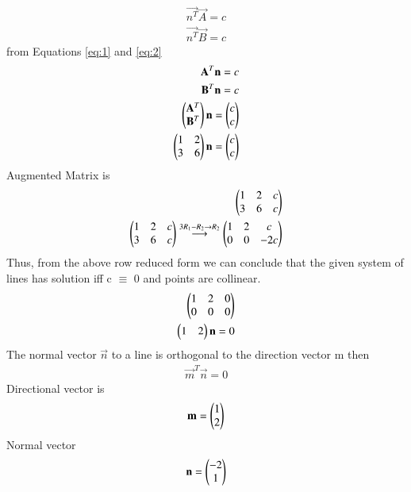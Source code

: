 \documentclass[journal,12pt,twocolumn]{IEEEtran}
\begin{document}
\begin {align}
\vec{n^T} \vec {A}=c \label{eq:1} \\
\vec{n^T} \vec {B}=c  \label{eq:2} 
\end{align}
from Equations \eqref{eq:1} and \eqref{eq:2} \\
\begin{align}
    \mathbf{A}^T \mathbf {n}=c \\
    \mathbf{B}^T \mathbf {n}=c  \\
    \begin{pmatrix}\mathbf{A}^T \\ \mathbf{B}^T\end{pmatrix} \mathbf{n}=\begin{pmatrix}c \\ c\end{pmatrix} \\
    \begin{pmatrix}1 &2 \\ 3&6\end{pmatrix} \mathbf{n}=\begin{pmatrix}c\\c\end{pmatrix}
\end{align}
Augmented Matrix is 
\begin{align}
    \begin{pmatrix}1&2&c\\3&6&c\end{pmatrix} \\
    \begin{pmatrix} 1 &  2 & c \\ 3&  6& c \end{pmatrix} \overset{3R_1-R_2\rightarrow R_2}{\longrightarrow} \begin{pmatrix} 1 &  2& c\\0 &  0 & -2c\end{pmatrix}
\end{align}
Thus, from the above row reduced form we can conclude that the given system of lines has solution iff c $\equiv$ 0 and points are collinear.
\begin{align}
    \begin{pmatrix} 1 &  2& 0\\0 &  0 & 0\end{pmatrix} \\
    \begin{pmatrix}1&2\end{pmatrix}\mathbf{n}=0
\end{align}
The normal vector $\vec{n}$ to a line is  orthogonal to the direction vector m then \\
\begin{align}
    \vec{m}^T\vec{n}=0
\end{align}
    Directional vector is 
\begin{align}
    \mathbf{m} = \begin{pmatrix}1 \\ 2\end{pmatrix}
\end{align}
    Normal vector 
\begin{align}
    \mathbf{n}= \begin{pmatrix}-2\\1\end{pmatrix}
\end{align}
\end{document}

